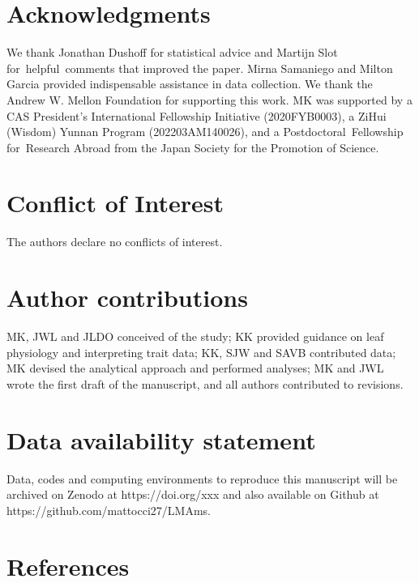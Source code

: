 \documentclass[
  12pt,
  letterpaper,
  DIV=11,
  numbers=noendperiod]{scrartcl}
\begin{document}
\hypertarget{acknowledgments}{%
\section{Acknowledgments}\label{acknowledgments}}

We thank Jonathan Dushoff for statistical advice and Martijn Slot
for~helpful~comments that improved the paper. Mirna Samaniego and Milton
Garcia provided indispensable assistance in data collection. We thank
the Andrew W. Mellon Foundation for supporting this work. MK was
supported by a CAS President's International Fellowship Initiative
(2020FYB0003), a ZiHui (Wisdom) Yunnan Program (202203AM140026), and a
Postdoctoral~Fellowship for~Research Abroad from the Japan Society for
the Promotion of Science.

\hypertarget{conflict-of-interest}{%
\section{Conflict of Interest}\label{conflict-of-interest}}

The authors declare no conflicts of interest.

\hypertarget{author-contributions}{%
\section{Author contributions}\label{author-contributions}}

MK, JWL and JLDO conceived of the study; KK provided guidance on leaf
physiology and interpreting trait data; KK, SJW and SAVB contributed
data; MK devised the analytical approach and performed analyses; MK and
JWL wrote the first draft of the manuscript, and all authors contributed
to revisions.

\hypertarget{data-availability-statement}{%
\section{Data availability
statement}\label{data-availability-statement}}

Data, codes and computing environments to reproduce this manuscript will
be archived on Zenodo at https://doi.org/xxx and also available on
Github at https://github.com/mattocci27/LMAms.

\hypertarget{references}{%
\section{References}\label{references}}
\end{document}
